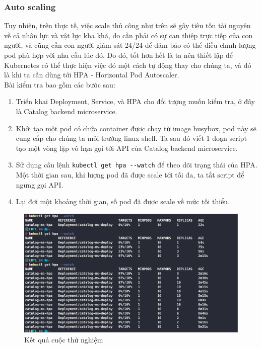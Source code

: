 \subsubsection{Auto scaling}
Tuy nhiên, trên thực tế, việc scale thủ công như trên sẽ gây tiêu tốn tài nguyên về cả nhân lực và vật lực kha khá, do cần phải có sự can thiệp trực tiếp của con người, và cũng cần con người giám sát 24/24 để đảm bảo có thể điều chỉnh lượng pod phù hợp với nhu cầu lúc đó. Do đó, tốt hơn hết là ta nên thiết lập để Kubernetes có thể thực hiện việc đó một cách tự động thay cho chúng ta, và đó là khi ta cần dùng tới HPA - Horizontal Pod Autoscaler.\\[0.5cm]
Bài kiểm tra bao gồm các bước sau:
\begin{enumerate}
  \item Triển khai Deployment, Service, và HPA cho đối tượng muốn kiểm tra, ở đây là Catalog backend microservice.
  \item Khởi tạo một pod có chứa container được chạy từ image busybox, pod này sẽ cung cấp cho chúng ta môi trường linux shell. Ta sau đó viết 1 đoạn script tạo một vòng lặp vô hạn gọi tới API của Catalog backend microservice.
  \item Sử dụng câu lệnh \lstinline|kubectl get hpa --watch| để theo dõi trạng thái của HPA. Một thời gian sau, khi lượng pod đã được scale tới tối đa, ta tắt script để ngưng gọi API. 
  \item Lại đợi một khoảng thời gian, số pod đã được scale về mức tối thiểu. 
\end{enumerate}
\begin{figure}[H]
  \begin{center}
    \includegraphics[scale=0.19]{images/hanh/HPA_CPU_scale.png}
    \caption{Kết quả cuộc thử nghiệm}
  \end{center}
\end{figure}
